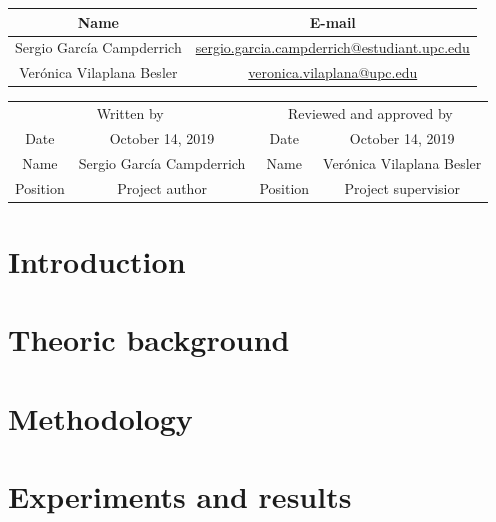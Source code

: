 \documentclass[a4paper,12pt,titlepage]{article}
\begin{document}
\begin{center}
\begin{tabular}{*2c}
\toprule
Name & E-mail \\
\midrule
Sergio García Campderrich & \url{sergio.garcia.campderrich@estudiant.upc.edu} \\
Verónica Vilaplana Besler & \url{veronica.vilaplana@upc.edu} \\
\bottomrule
\end{tabular}
\end{center}

\begin{center}
\begin{tabular}{*4c}
\toprule
\multicolumn{2}{c}{Written by} & \multicolumn{2}{c}{Reviewed and approved by}\\
Date & October 14, 2019 & Date & October 14, 2019 \\
\midrule
Name & Sergio García Campderrich & Name & Verónica Vilaplana Besler \\
Position & Project author & Position & Project supervisior \\
\bottomrule
\end{tabular}
\end{center}

\tableofcontents

\listoffigures

\listoftables

\printglossary[type=\acronymtype,title=Acronyms]

\newpage
{}

\section{Introduction}\label{sec:introduction}


\section{Theoric background}\label{sec:theoric-background}



\section{Methodology}\label{sec:methodology}


\section{Experiments and results}\label{sec:experiments-and-results}

\end{document}
